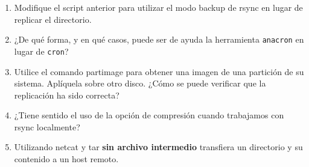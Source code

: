 \begin{enumerate}
	\item Modifique el script anterior para utilizar el modo backup de rsync en lugar de replicar el directorio.
	\item ¿De qué forma, y en qué casos, puede ser de ayuda la herramienta \lstinline$anacron$ en lugar de \lstinline$cron$? 
	\item Utilice el comando partimage para obtener una imagen de una partición de su sistema. Aplíquela sobre otro disco. ¿Cómo se puede verificar que la replicación ha sido correcta? 
	\item ¿Tiene sentido el uso de la opción de compresión cuando trabajamos con rsync localmente?
	\item Utilizando netcat y tar {\bf sin archivo intermedio} transfiera un directorio y su contenido a un host remoto. 
\end{enumerate}
